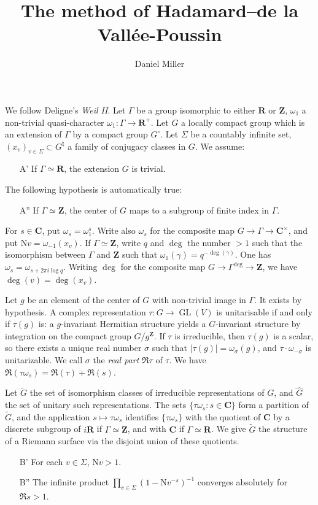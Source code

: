 \documentclass{article}
\title{The method of Hadamard--de la Vall\'ee-Poussin}
\author{Daniel Miller}
\DeclareMathOperator{\GL}{GL}
\newcommand{\bC}{\mathbf{C}}
\newcommand{\bR}{\mathbf{R}}
\newcommand{\bZ}{\mathbf{Z}}
\newcommand{\N}{\mathrm{N}}
\begin{document}
\maketitle





We follow Deligne's \emph{Weil II}. Let $\Gamma$ be a group isomorphic to 
either $\bR$ or $\bZ$, $\omega_1$ a non-trivial quasi-character 
$\omega_1\colon \Gamma\to \bR^+$. Let $G$ a locally compact group which is an 
extension of $\Gamma$ by a compact group $G^\circ$. Let $\Sigma$ be a 
countably infinite set, $(x_v)_{v\in \Sigma}\subset G^\natural$ a family of 
conjugacy classes in $G$. We assume: 
\begin{itemize}
\item[A'] If $\Gamma\simeq \bR$, the extension $G$ is trivial.
\end{itemize}
The following hypothesis is automatically true:
\begin{itemize}
\item[A''] If $\Gamma\simeq \bZ$, the center of $G$ maps to a subgroup of 
finite index in $\Gamma$. 
\end{itemize}

For $s\in \bC$, put $\omega_s = \omega_1^s$. Write also $\omega_s$ for the 
composite map $G\to \Gamma\to \bC^\times$, and put $\N v = \omega_{-1}(x_v)$. 
If $\Gamma\simeq \bZ$, write $q$ and $\deg$ the number $>1$ such that the 
isomorphism between $\Gamma$ and $\bZ$ such that 
$\omega_1(\gamma) = q^{-\deg(\gamma)}$. One has 
$\omega_s = \omega_{s+2\pi i\log q}$. Writing $\deg$ for the composite 
map $G\to \Gamma^{\deg}\to \bZ$, we have $\deg(v)=\deg(x_v)$. 

Let $g$ be an element of the center of $G$ with non-trivial image in $\Gamma$. 
It exists by hypothesis. A complex representation $\tau\colon G\to \GL(V)$ is 
unitarisable if and only if $\tau(g)$ is: a $g$-invariant Hermitian structure 
yields a $G$-invariant structure by integration on the compact group 
$G/g^\bZ$. If $\tau$ is irreducible, then $\tau(g)$ is a scalar, so there 
exists a unique real number $\sigma$ such that $|\tau(g)|=\omega_\sigma(g)$, 
and $\tau\cdot \omega_{-\sigma}$ is unitarizable. We call $\sigma$ the 
\emph{real part} $\Re\tau$ of $\tau$. We have 
$\Re(\tau\omega_s)=\Re(\tau)+\Re(s)$. 

Let $\widetilde G$ the set of isomorphism classes of irreducible 
representations of $G$, and $\widehat G$ the set of unitary such 
representations. The sets $\{\tau \omega_s : s\in \bC\}$ form a partition of 
$\widetilde G$, and the application $s\mapsto \tau \omega_s$ identifies 
$\{\tau\omega_s\}$ with the quotient of $\bC$ by a discrete subgroup of 
$i\bR$ if $\Gamma\simeq \bZ$, and with $\bC$ if $\Gamma\simeq \bR$. We give 
$\widetilde G$ the structure of a Riemann surface via the disjoint union of 
these quotients. 
\begin{itemize}
\item[B'] For each $v\in\Sigma$, $\N v>1$.
\item[B''] The infinite product $\prod_{v\in \Sigma} (1-\N v^{-s})^{-1}$ 
converges absolutely for $\Re s>1$. 
\end{itemize}
\end{document}
